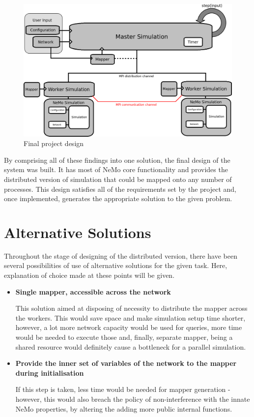 \begin{figure}[h]
\begin{center}
\includegraphics[scale = 0.45]{images/final_design.png}
\end{center}
\caption{Final project design}
\end{figure}

By comprising all of these findings into one solution, the final design of the system was built. It has most of NeMo core functionality and provides the distributed version of simulation that could be mapped onto any number of processes. This design satisfies all of the requirements set by the project and, once implemented, generates the appropriate solution to the given problem.

\clearpage

\section{Alternative Solutions}

Throughout the stage of designing of the distributed version, there have been several possibilities of use of alternative solutions for the given task. Here, explanation of choice made at these points will be given.

\begin{itemize}

\item{\textbf{Single mapper, accessible across the network}}

This solution aimed at disposing of necessity to distribute the mapper across the workers. This would save space and make simulation setup time shorter, however, a lot more network capacity would be used for queries, more time would be needed to execute those and, finally, separate mapper, being a shared resource would definitely cause a bottleneck for a parallel simulation.

\item{\textbf{Provide the inner set of variables of the network to the mapper during initialisation}}

If this step is taken, less time would be needed for mapper generation - however, this would also breach the policy of non-interference with the innate NeMo properties, by altering the adding more public internal functions.

\end{itemize}

